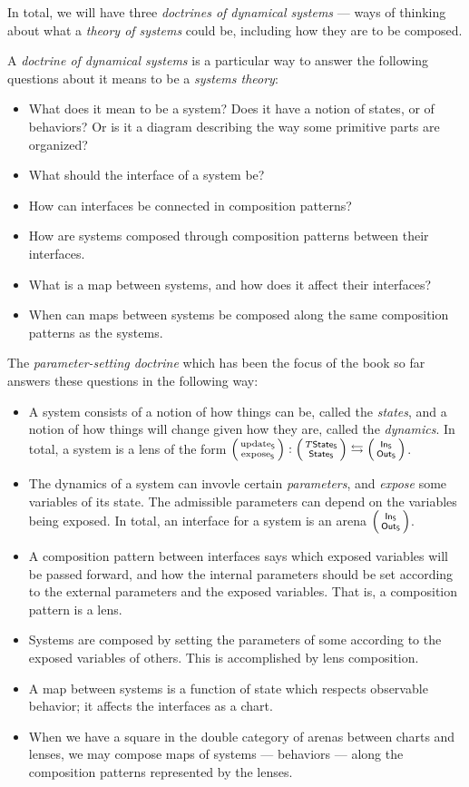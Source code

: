 \documentclass[DynamicalBook]{subfiles}
\begin{document}
In total, we will have three \emph{doctrines of dynamical systems} --- ways of thinking about what a \emph{theory of systems} could be, including how they are to be composed.

\begin{informal}\label{informal:paradigm}
 A \emph{doctrine of dynamical systems} is a particular way to answer the following questions about it means to be a \emph{systems theory}:
 \begin{itemize}
   \item What does it mean to be a system? Does it have a notion of states, or of behaviors? Or is it a diagram describing the way some primitive parts are organized?
   \item What should the interface of a system be?
   \item How can interfaces be connected in composition patterns?
  \item How are systems composed through composition patterns between their interfaces.
  \item What is a map between systems, and how does it affect their interfaces?
  \item When can maps between systems be composed along the same composition patterns as the systems.
  \end{itemize}
  \end{informal}

The \emph{parameter-setting doctrine} which has been the focus of the book so far answers these questions in the following way:
\begin{itemize}
  \item A system consists of a notion of how things can be, called the \emph{states}, and a notion of how things will change given how they are, called the \emph{dynamics}. In total, a system is a lens of the form $\lens{\update{S}}{\expose{S}} : \lens{T\State{S}}{\State{S}} \fromto \lens{\In{S}}{\Out{S}}$.
  \item The dynamics of a system can invovle certain \emph{parameters}, and \emph{expose} some variables of its state. The admissible parameters can depend on the variables being exposed. In total, an interface for a system is an arena $\lens{\In{S}}{\Out{S}}$.
  \item A composition pattern between interfaces says which exposed variables will be passed forward, and how the internal parameters should be set according to the external parameters and the exposed variables. That is, a composition pattern is a lens.
\item Systems are composed by setting the parameters of some according to the exposed variables of others. This is accomplished by lens composition.
  \item A map between systems is a function of state which respects observable behavior; it affects the interfaces as a chart.
  \item When we have a square in the double category of arenas between charts and lenses, we may compose maps of systems --- behaviors --- along the composition patterns represented by the lenses.
\end{itemize}
\end{document}

